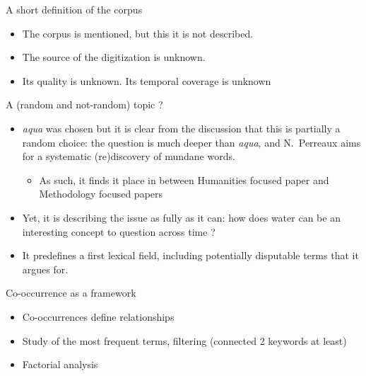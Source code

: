 \documentclass[aspectratio=169]{beamer}
\begin{document}
\begin{frame}{A short definition of the corpus}
    \begin{itemize}
        \item The corpus is mentioned, but this it is not described.
        \item The source of the digitization is unknown.
        \item Its quality is unknown.
        \items Its temporal coverage is unknown
    \end{itemize}
\end{frame}

\begin{frame}{A (random and not-random) topic ?}

    \begin{itemize}
        \item \textit{aqua} was chosen but it is clear from the discussion that this is partially a random choice: the question is much deeper than \textit{aqua}, and N.~Perreaux aims for a systematic (re)discovery of mundane words.
        \begin{itemize}
            \item As such, it finds it place in between Humanities focused paper and Methodology focused papers
        \end{itemize}
        \item Yet, it is describing the issue as fully as it can: how does water can be an interesting concept to question across time ?
        \item It predefines a first lexical field, including potentially disputable terms that it argues for.
    \end{itemize}
    
\end{frame}

\begin{frame}{Co-occurrence as a framework}
    \begin{itemize}
        \item Co-occurrences define relationships
        \item Study of the most frequent terms, filtering (connected 2 keywords at least)
        \item Factorial analysis
    \end{itemize}
\end{frame}
\end{document}
